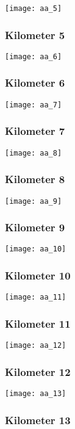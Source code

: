 \documentclass[]{article}
\begin{document}
\texttt{[image: aa\_5]}

\subsubsection{Kilometer 5}\label{kilometer-5-21}

\texttt{[image: aa\_6]}

\subsubsection{Kilometer 6}\label{kilometer-6-16}

\texttt{[image: aa\_7]}

\subsubsection{Kilometer 7}\label{kilometer-7-11}

\texttt{[image: aa\_8]}

\subsubsection{Kilometer 8}\label{kilometer-8-6}

\texttt{[image: aa\_9]}

\subsubsection{Kilometer 9}\label{kilometer-9-4}

\texttt{[image: aa\_10]}

\subsubsection{Kilometer 10}\label{kilometer-10-4}

\texttt{[image: aa\_11]}

\subsubsection{Kilometer 11}\label{kilometer-11-1}

\texttt{[image: aa\_12]}

\subsubsection{Kilometer 12}\label{kilometer-12-1}

\texttt{[image: aa\_13]}

\subsubsection{Kilometer 13}\label{kilometer-13}
\end{document}
